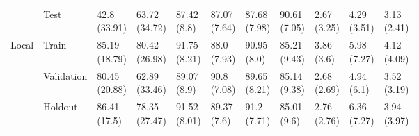 \begin{table}
\begin{tabular}{lllllllllll}
       & Test &   \makecell{42.8\\(33.91)} &  \makecell{63.72\\(34.72)} &   \makecell{87.42\\(8.8)} &  \makecell{87.07\\(7.64)} &  \makecell{87.68\\(7.98)} &  \makecell{90.61\\(7.05)} &      \makecell{2.67\\(3.25)} &  \makecell{4.29\\(3.51)} &  \makecell{3.13\\(2.41)} \\
Local & Train &  \makecell{85.19\\(18.79)} &  \makecell{80.42\\(26.98)} &  \makecell{91.75\\(8.21)} &   \makecell{88.0\\(7.93)} &   \makecell{90.95\\(8.0)} &  \makecell{85.21\\(9.43)} &       \makecell{3.86\\(3.6)} &  \makecell{5.98\\(7.27)} &  \makecell{4.12\\(4.09)} \\
       & Validation &  \makecell{80.45\\(20.88)} &  \makecell{62.89\\(33.46)} &   \makecell{89.07\\(8.9)} &   \makecell{90.8\\(7.08)} &  \makecell{89.65\\(8.21)} &  \makecell{85.14\\(9.38)} &      \makecell{2.68\\(2.69)} &   \makecell{4.94\\(6.1)} &  \makecell{3.52\\(3.19)} \\
       & Holdout &   \makecell{86.41\\(17.5)} &  \makecell{78.35\\(27.47)} &  \makecell{91.52\\(8.01)} &   \makecell{89.37\\(7.6)} &   \makecell{91.2\\(7.71)} &   \makecell{85.01\\(9.6)} &      \makecell{2.76\\(2.76)} &  \makecell{6.36\\(7.27)} &  \makecell{3.94\\(3.97)} \\

\end{tabular}
\end{table}
